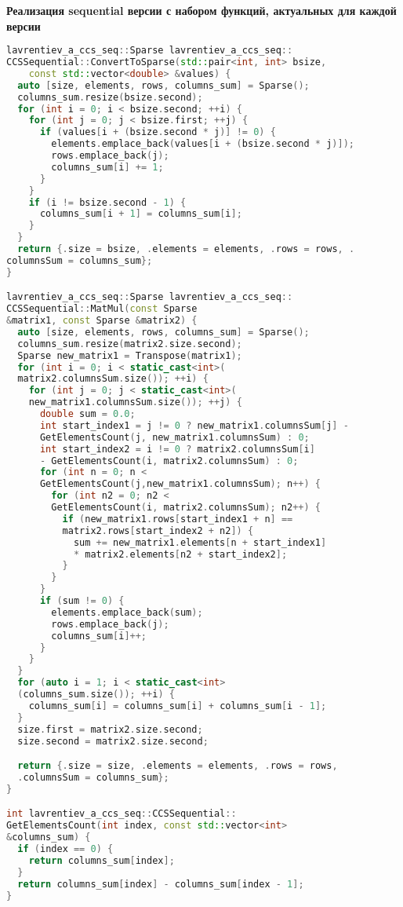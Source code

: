 \documentclass[12pt]{article}
\begin{document}
\textbf{Реализация sequential версии с набором функций, актуальных для каждой версии} \\
\lstset{style=mystyle}
\begin{lstlisting}[language=C++]
lavrentiev_a_ccs_seq::Sparse lavrentiev_a_ccs_seq::
CCSSequential::ConvertToSparse(std::pair<int, int> bsize, 
    const std::vector<double> &values) {
  auto [size, elements, rows, columns_sum] = Sparse();
  columns_sum.resize(bsize.second);
  for (int i = 0; i < bsize.second; ++i) {
    for (int j = 0; j < bsize.first; ++j) {
      if (values[i + (bsize.second * j)] != 0) {
        elements.emplace_back(values[i + (bsize.second * j)]);
        rows.emplace_back(j);
        columns_sum[i] += 1;
      }
    }
    if (i != bsize.second - 1) {
      columns_sum[i + 1] = columns_sum[i];
    }
  }
  return {.size = bsize, .elements = elements, .rows = rows, .
columnsSum = columns_sum};
}

lavrentiev_a_ccs_seq::Sparse lavrentiev_a_ccs_seq::
CCSSequential::MatMul(const Sparse 
&matrix1, const Sparse &matrix2) {
  auto [size, elements, rows, columns_sum] = Sparse();
  columns_sum.resize(matrix2.size.second);
  Sparse new_matrix1 = Transpose(matrix1);
  for (int i = 0; i < static_cast<int>(
  matrix2.columnsSum.size()); ++i) {
    for (int j = 0; j < static_cast<int>(
    new_matrix1.columnsSum.size()); ++j) {
      double sum = 0.0;
      int start_index1 = j != 0 ? new_matrix1.columnsSum[j] -
      GetElementsCount(j, new_matrix1.columnsSum) : 0;
      int start_index2 = i != 0 ? matrix2.columnsSum[i]
      - GetElementsCount(i, matrix2.columnsSum) : 0;
      for (int n = 0; n < 
      GetElementsCount(j,new_matrix1.columnsSum); n++) {
        for (int n2 = 0; n2 < 
        GetElementsCount(i, matrix2.columnsSum); n2++) {
          if (new_matrix1.rows[start_index1 + n] == 
          matrix2.rows[start_index2 + n2]) {
            sum += new_matrix1.elements[n + start_index1] 
            * matrix2.elements[n2 + start_index2];
          }
        }
      }
      if (sum != 0) {
        elements.emplace_back(sum);
        rows.emplace_back(j);
        columns_sum[i]++;
      }
    }
  }
  for (auto i = 1; i < static_cast<int>
  (columns_sum.size()); ++i) {
    columns_sum[i] = columns_sum[i] + columns_sum[i - 1];
  }
  size.first = matrix2.size.second;
  size.second = matrix2.size.second;

  return {.size = size, .elements = elements, .rows = rows, 
  .columnsSum = columns_sum};
}

int lavrentiev_a_ccs_seq::CCSSequential::
GetElementsCount(int index, const std::vector<int> 
&columns_sum) {
  if (index == 0) {
    return columns_sum[index];
  }
  return columns_sum[index] - columns_sum[index - 1];
}


\end{lstlisting}
\end{document}
